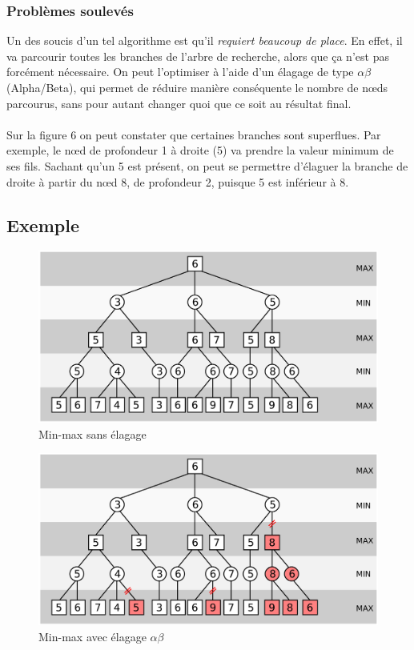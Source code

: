 \documentclass[a4paper,12pt]{article}
\begin{document}
\subsubsection{Problèmes soulevés}
Un des soucis d'un tel algorithme est qu'il \emph{requiert beaucoup de place}. En effet, il va parcourir toutes les branches de l'arbre de recherche, alors que ça n'est pas forcément nécessaire. On peut l'optimiser à l'aide d'un élagage de type $\alpha\beta$ (Alpha/Beta), qui permet de réduire manière conséquente le nombre de n\oe{}ds parcourus, sans pour autant changer quoi que ce soit au résultat final.
\\\\
Sur la figure 6 on peut constater que certaines branches sont superflues. Par exemple, le n\oe{}d de profondeur 1 à droite (5) va prendre la valeur minimum de ses fils. Sachant qu'un 5 est présent, on peut se permettre d'élaguer la branche de droite à partir du n\oe{}d 8, de profondeur 2, puisque 5 est inférieur à 8.

\subsection{Exemple}
\begin{figure}[H]
    \centering
    \includegraphics[width=.8\textwidth]{./pix/minimax}
    \caption{Min-max sans élagage}
\end{figure}

\begin{figure}[H]
    \centering
    \includegraphics[width=.8\textwidth]{./pix/alphabeta}
    \caption{Min-max avec élagage $\alpha\beta$}
\end{figure}
  \newpage
\end{document}

